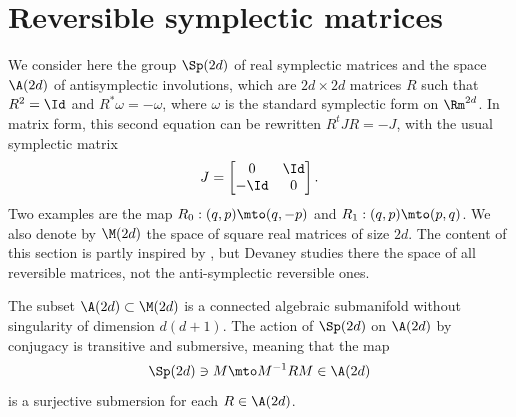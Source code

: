 \section{Reversible symplectic matrices}

We consider here the group $\Sp(2d)$ of real symplectic matrices and the space $\A(2d)$ of antisymplectic involutions, which are $2d\times 2d$
matrices $R$ such that $R^2=\Id$ and $R^*\omega=-\omega$, where $\omega$ is the standard symplectic form on $\Rm^{2d}$. In matrix form,
this second equation can be rewritten $R^tJR=-J$, with the usual symplectic matrix
\[
J=
\begin{bmatrix} 0&\Id\\-\Id&0
\end{bmatrix}.
\]
Two examples are the map $R_0:(q,p)\mto (q,-p)$ and $R_1:(q,p)\mto (p,q)$. We also denote by $\M(2d)$ the space of square real matrices of size $2d$. The content of this section is partly inspired by \cite[\S V]{D}, but Devaney studies there the space of all reversible matrices, not the anti-symplectic reversible ones.

\begin{prop}\label{prop-conj}
The subset $\A(2d)\subset \M(2d)$ is a connected algebraic submanifold without singularity of dimension $d(d+1)$.
The action of $\Sp(2d)$ on $\A(2d)$ by conjugacy is transitive and submersive, meaning that the map
\[
\Sp(2d)\ni M\mto M^{-1}RM\in \A(2d)
\]
is a surjective submersion for each $R\in \A(2d)$.
\end{prop}

